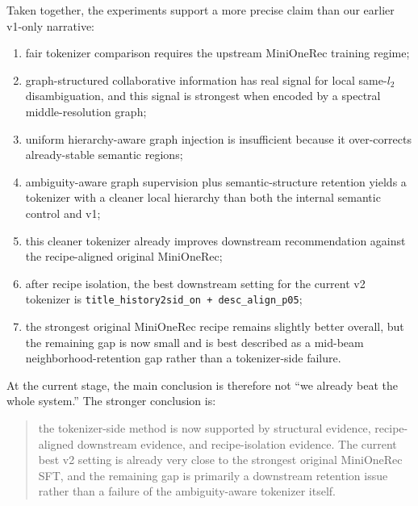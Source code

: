 Taken together, the experiments support a more precise claim than our earlier v1-only narrative:
\begin{enumerate}[leftmargin=1.4em]
  \item fair tokenizer comparison requires the upstream MiniOneRec training regime;
  \item graph-structured collaborative information has real signal for local same-$l_2$ disambiguation, and this signal is strongest when encoded by a spectral middle-resolution graph;
  \item uniform hierarchy-aware graph injection is insufficient because it over-corrects already-stable semantic regions;
  \item ambiguity-aware graph supervision plus semantic-structure retention yields a tokenizer with a cleaner local hierarchy than both the internal semantic control and v1;
  \item this cleaner tokenizer already improves downstream recommendation against the recipe-aligned original MiniOneRec;
  \item after recipe isolation, the best downstream setting for the current v2 tokenizer is \texttt{title\_history2sid\_on + desc\_align\_p05};
  \item the strongest original MiniOneRec recipe remains slightly better overall, but the remaining gap is now small and is best described as a mid-beam neighborhood-retention gap rather than a tokenizer-side failure.
\end{enumerate}

At the current stage, the main conclusion is therefore not ``we already beat the whole system.'' The stronger conclusion is:
\begin{quote}
the tokenizer-side method is now supported by structural evidence, recipe-aligned downstream evidence, and recipe-isolation evidence. The current best v2 setting is already very close to the strongest original MiniOneRec SFT, and the remaining gap is primarily a downstream retention issue rather than a failure of the ambiguity-aware tokenizer itself.
\end{quote}

